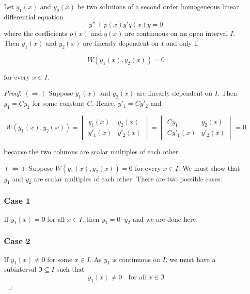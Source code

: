\begin{theorem}
    Let $y_1(x)$ and $y_2(x)$ be two solutions of a second order homogeneous linear 
    differential equation 
    \begin{equation}
        y'' + p(x)y' q(x)y = 0
    \end{equation}
    where the coefficients $p(x)$ and $q(x)$ are continuous on an open interval $I$. 
    Then $y_1(x)$ and $y_2(x)$ are linearly dependent on $I$ and only if 
    
    \begin{equation}
        W(y_1(x), y_2(x)) = 0
    \end{equation}

    for every $x \in I$.
\end{theorem}
\begin{proof}
    $(\Rightarrow)$ Suppose $y_1(x)$ and $y_2(x)$ are linearly dependent on $I$. Then $y_1 = Cy_2$ for some 
    constant $C$. Hence, $y'_1 = Cy'_2$ and 
    
    \begin{equation*}
        W(y_1(x), y_2(x)) = \begin{vmatrix}
            y_1(x) & y_2(x)\\ y'_1(x) & y'_2(x) 
        \end{vmatrix} = \begin{vmatrix}
            Cy_1 & y_2(x)\\ Cy'_1(x) & y'_2(x) 
        \end{vmatrix} = 0
    \end{equation*}

    because the two columns are scalar multiples of each other.

    $(\Leftarrow)$ Suppose $W(y_1(x), y_2(x)) = 0$ for every $x \in I$. We must show that 
     $y_1$ and $y_2$ are scalar multiples of each other. There are two possible cases:

     \subsubsection*{Case 1}
     If $y_1(x) = 0$ for all $x \in I$, then $y_1 = 0 \cdot y_2$ and we are done here.

     \subsubsection*{Case 2}
     If $y_1(x) \neq 0$ for some $x \in I$. As $y_1$ is continuous on $I$, we must have a subinterval 
     $\mathfrak{I} \subseteq I$ such that 
     \[
        y_1(x) \neq 0 \quad \text{for all } x \in \mathfrak{I}
     \]
    

\end{proof}
